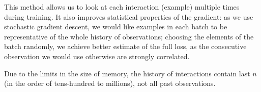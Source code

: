 This method allows us to look at each interaction (example) multiple times during training. It also improves statistical properties of the gradient: as we use stochastic gradient descent, we would like examples in each batch to be representative of the whole history of observations; choosing the elements of the batch randomly, we achieve better estimate of the full loss, as the consecutive observation we would use otherwise are strongly correlated.

Due to the limits in the size of memory, the history of interactions contain last $n$ (in the order of tens-hundred to millions), not all past observations.
